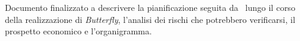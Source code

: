 Documento finalizzato a descrivere la pianificazione seguita da \gruppo\ lungo il corso della realizzazione di \textit{Butterfly},
l'analisi dei rischi che potrebbero verificarsi, il prospetto economico e l'organigramma.
